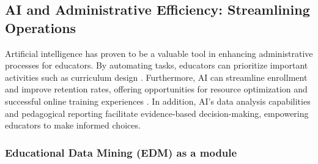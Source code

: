 

\subsection{AI and Administrative Efficiency: Streamlining Operations}
Artificial intelligence has proven to be a valuable tool in enhancing administrative processes for educators.
By automating tasks, educators can prioritize important activities such as curriculum design \citep{drach_use_2023}.
Furthermore, AI can streamline enrollment and improve retention rates, offering opportunities for resource optimization
and successful online training experiences \citep{lukianets_promises_2023}. In addition, AI's data analysis capabilities
and pedagogical reporting facilitate evidence-based decision-making, empowering educators to make informed choices\citep{guerrero-quinonez_artificial_2023}.

\subsubsection{Educational Data Mining (EDM) as a module}

